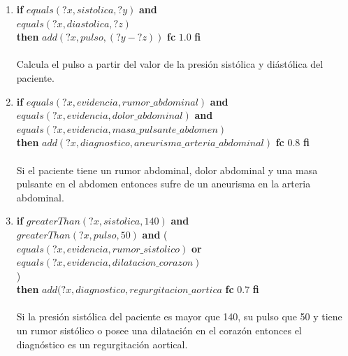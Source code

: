 \documentclass[10pt, a4paper,spanish]{article}
\begin{document}
			\begin{enumerate}[label={\textbf{R\theenumi:}}]

				\item
					\textbf{if} $equals(?x, sistolica, ?y)$ \textbf{and} \\
						\hspace*{0.5cm} $equals(?x, diastolica, ?z)$ \\
					\textbf{then} $add(?x, pulso, (?y - ?z) )$ \textbf{fc} $1.0 $ \textbf{fi}
					\\ \\
					Calcula el pulso a partir del valor de la presión sistólica y diástólica del paciente.

				\item
					\textbf{if} $equals(?x, evidencia, rumor\_abdominal)$ \textbf{and} \\
						\hspace*{0.5cm} $equals(?x, evidencia, dolor\_abdominal)$ \textbf{and} \\
						\hspace*{0.5cm} $equals(?x, evidencia, masa\_pulsante\_abdomen)$ \\
					\textbf{then} $add(?x, diagnostico, aneurisma\_arteria\_abdominal)$ \textbf{fc} $0.8$ \textbf{fi}
					\\ \\
					Si el paciente tiene un rumor abdominal, dolor abdominal y una masa pulsante en el abdomen entonces sufre de un aneurisma en la arteria abdominal.

				\item
					\textbf{if} $greaterThan(?x, sistolica, 140)$ \textbf{and} \\
						\hspace*{0.5cm} $greaterThan(?x, pulso, 50)$ \textbf{and} ( \\
							\hspace*{1cm} $equals(?x, evidencia, rumor\_sistolico)$  \textbf{or}\\
							\hspace*{1cm} $equals(?x, evidencia, dilatacion\_corazon)$ \\
						\hspace*{0.5cm} ) \\
					\textbf{then} $add(?x, diagnostico, regurgitacion\_aortica$ \textbf{fc} $0.7$ \textbf{fi}
					\\ \\
					Si la presión sistólica del paciente es mayor que 140, su pulso que 50 y tiene un rumor sistólico o posee una dilatación en el corazón entonces el diagnóstico es un regurgitación aortical.


\end{enumerate}
\end{document}
